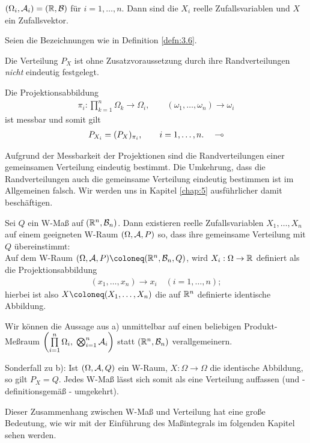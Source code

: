 \begin{bemn}
$(\Omega _{i}, \AA_{i}) =
(\R, {\BB})$ für $i=1, \ldots, n$. Dann sind die $X_i$ reelle
Zufallsvariablen und $X$ ein Zufallsvektor.\maphere
\end{bemn}

\begin{bem}[Bemerkungen.]
\label{bem:3.5}
Seien die Bezeichnungen wie in Definition \ref{defn:3.6}.
\begin{bemenum}
\item
Die Verteilung $P_{X}$ ist ohne Zusatzvoraussetzung durch ihre Randverteilungen
\textit{nicht} eindeutig festgelegt.
\item
Die Projektionsabbildung
\begin{align*}
\pi _{i} : \prod^{n}_{k=1} \Omega _{k} \to \Omega_{i},\qquad (\omega _{1},
\ldots, \omega _{n}) \to \omega _{i}
\end{align*}
ist messbar
und somit gilt
\begin{align*}
P_{X_{i}} = (P_{X})_{\pi _{i}},\qquad i=1, \ldots , n.\maphere
\end{align*}
\end{bemenum}
\end{bem}

Aufgrund der Messbarkeit der Projektionen sind die Randverteilungen
einer gemeinsamen Verteilung eindeutig bestimmt. Die Umkehrung, dass die
Randverteilungen auch die gemeinsame Verteilung eindeutig bestimmen ist im
Allgemeinen falsch. Wir werden uns in Kapitel \ref{chap:5} ausführlicher damit
beschäftigen.

\begin{bem}[Bemerkungen.]
\label{bem:3.6}
\begin{bemenum}
\item
Sei $Q$ ein W-Maß auf $(\R^n, {\BB}_{n})$.
Dann existieren reelle Zufallsvariablen $X_{1}, \ldots , X_{n}$
auf einem geeigneten W-Raum $(\Omega ,\AA,P)$ so,
dass ihre gemeinsame Verteilung mit $Q$ übereinstimmt: \\
Auf dem W-Raum $(\Omega, \AA,P) \defl (\R^{n}, {\BB}_{n}, Q)$, wird
$X_{i} : \Omega \to \R$ definiert als die Projektionsabbildung
\begin{align*}
(x_{1}, \ldots, x_{n}) \to x_{i} \quad (i=1, \ldots,n);
\end{align*}
hierbei ist also $X\defl (X_{1}, \ldots ,X_{n})$ die auf
$\R^n$ definierte identische Abbildung.
\item
Wir können die Aussage aus a) unmittelbar auf einen beliebigen Produkt-Meßraum
$\left(\prod\limits^{n}_{i=1}\Omega _{i}, \;
\bigotimes^{n}_{i=1} \AA_{i}\right)$
statt $(\R^{n}, {\BB}_{n})$ verallgemeinern.
\item Sonderfall zu b): Ist $(\Omega, \AA,Q)$ ein W-Raum, $X:\Omega \to
\Omega$ die identische Abbildung, so gilt $P_{X} =Q$. Jedes W-Maß lässt sich somit
als eine Verteilung auffassen (und - definitionsgemäß - umgekehrt).\maphere
\end{bemenum}
\end{bem}

Dieser Zusammenhang zwischen W-Maß und Verteilung hat eine große Bedeutung, wie
wir mit der Einführung des Maßintegrals im folgenden Kapitel sehen werden.
